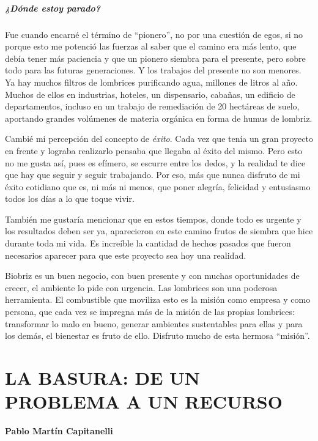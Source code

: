\documentclass[
]{article}
\begin{document}
\hypertarget{duxf3nde-estoy-parado}{%
\subparagraph{¿Dónde estoy parado?}\label{duxf3nde-estoy-parado}}

Fue cuando encarné el término de ``pionero'', no por una cuestión de
egos, si no porque esto me potenció las fuerzas al saber que el camino
era más lento, que debía tener más paciencia y que un pionero siembra
para el presente, pero sobre todo para las futuras generaciones. Y los
trabajos del presente no son menores. Ya hay muchos filtros de lombrices
purificando agua, millones de litros al año. Muchos de ellos en
industrias, hoteles, un dispensario, cabañas, un edificio de
departamentos, incluso en un trabajo de remediación de 20 hectáreas de
suelo, aportando grandes volúmenes de materia orgánica en forma de humus
de lombriz.

Cambié mi percepción del concepto de \emph{éxito}. Cada vez que tenía un
gran proyecto en frente y lograba realizarlo pensaba que llegaba al
éxito del mismo. Pero esto no me gusta así, pues es efímero, se escurre
entre los dedos, y la realidad te dice que hay que seguir y seguir
trabajando. Por eso, más que nunca disfruto de mi éxito cotidiano que
es, ni más ni menos, que poner alegría, felicidad y entusiasmo todos los
días a lo que toque vivir.

También me gustaría mencionar que en estos tiempos, donde todo es
urgente y los resultados deben ser ya, aparecieron en este camino frutos
de siembra que hice durante toda mi vida. Es increíble la cantidad de
hechos pasados que fueron necesarios aparecer para que este proyecto sea
hoy una realidad.

Biobriz es un buen negocio, con buen presente y con muchas oportunidades
de crecer, el ambiente lo pide con urgencia. Las lombrices son una
poderosa herramienta. El combustible que moviliza esto es la misión como
empresa y como persona, que cada vez se impregna más de la misión de las
propias lombrices: transformar lo malo en bueno, generar ambientes
sustentables para ellas y para los demás, el bienestar es fruto de ello.
Disfruto mucho de esta hermosa ``misión''.

\cleardoublepage

\hypertarget{la-basura-de-un-problema-a-un-recurso}{%
\section{LA BASURA: DE UN PROBLEMA A UN
RECURSO}\label{la-basura-de-un-problema-a-un-recurso}}

\textbf{Pablo Martín Capitanelli}
\end{document}

